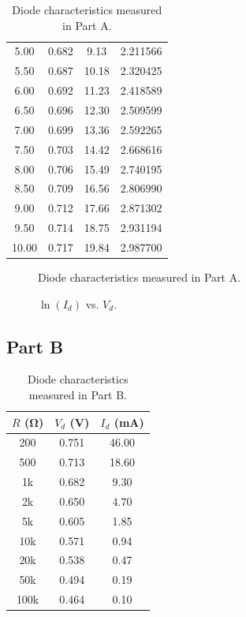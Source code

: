 \documentclass{article}
\begin{document}
\begin{table}[hbtp]
\begin{tabular}{cccc}
    5.00 & 0.682 & 9.13 & 2.211566 \\
    5.50 & 0.687 & 10.18 & 2.320425 \\
    6.00 & 0.692 & 11.23 & 2.418589 \\
    6.50 & 0.696 & 12.30 & 2.509599 \\
    7.00 & 0.699 & 13.36 & 2.592265 \\
    7.50 & 0.703 & 14.42 & 2.668616 \\
    8.00 & 0.706 & 15.49 & 2.740195 \\
    8.50 & 0.709 & 16.56 & 2.806990 \\
    9.00 & 0.712 & 17.66 & 2.871302 \\
    9.50 & 0.714 & 18.75 & 2.931194 \\
    10.00 & 0.717 & 19.84 & 2.987700 \\
  \end{tabular}
  \caption{\label{tab:part_a} Diode characteristics measured in Part A.}
\end{table}

\begin{figure}[hbtp]
  \centering
  
  \caption{\label{fig:part_a_graph} Diode characteristics measured in Part A.}
\end{figure}

\begin{figure}[hbtp]
  \centering
  
  \caption{\label{fig:part_a_graph2} $\ln{(I_d)}$ vs. $V_d$.}
\end{figure}

\subsection{Part B}
\label{sec:result_b}

\begin{table}[hbtp]
  \centering
  \begin{tabular}{ccc}
    $R$ (\si{\ohm}) & $V_d$ (\si{V}) & $I_d$ (\si{mA}) \\
    \hline
    200 & 0.751 & 46.00 \\
    500 & 0.713 & 18.60 \\
    1k & 0.682 & 9.30 \\
    2k & 0.650 & 4.70 \\
    5k & 0.605 & 1.85 \\
    10k & 0.571 & 0.94 \\
    20k & 0.538 & 0.47 \\
    50k & 0.494 & 0.19 \\
    100k & 0.464 & 0.10 \\
  \end{tabular}
  \caption{\label{tab:part_b} Diode characteristics measured in Part B.}
\end{table}
\end{document}
